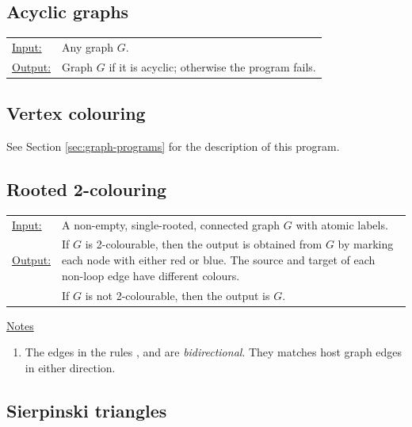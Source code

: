 \subsection{Acyclic graphs}
\label{sec:acyclic}

\begin{tabular}{lp{10.5cm}}
\ul{Input:} & Any graph $G$. \\
\ul{Output:} & Graph $G$ if it is acyclic; otherwise the program fails.
\end{tabular}
  
\begin{center}

\end{center}


\subsection{Vertex colouring}

See Section \ref{sec:graph-programs} for the description of this program.


\subsection{Rooted 2-colouring}

\begin{tabular}{lp{10.5cm}}
\ul{Input:} & A non-empty, single-rooted, connected graph $G$ with atomic labels. \\
\ul{Output:} & If $G$\/ is 2-colourable, then the output is obtained from $G$\/ by marking each node with either red or blue. The source and target of each non-loop edge have different colours.\\
& If $G$\/ is not 2-colourable, then the output is $G$.
\end{tabular}

\begin{center}

\end{center}

\ul{Notes}
\begin{enumerate}
\setlength{\itemsep}{-.5ex}
\item The edges in the rules ,  and  are \emph{bidirectional}. They matches host graph edges in either direction.
\end{enumerate}


\subsection{Sierpinski triangles}

